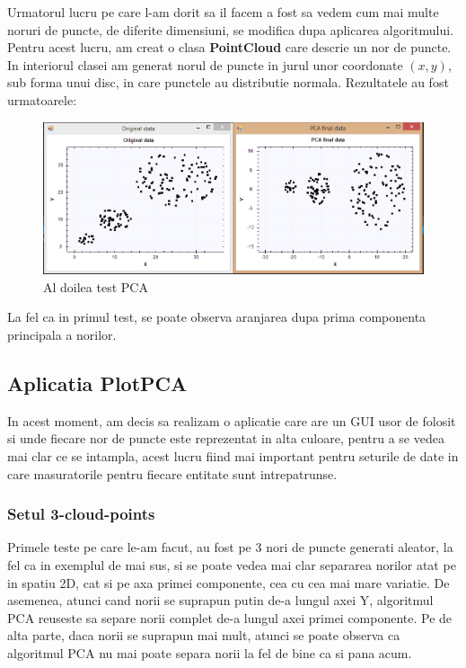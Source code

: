 \documentclass[12pt]{article}
\begin{document}
Urmatorul lucru pe care l-am dorit sa il facem a fost sa vedem cum mai multe noruri de puncte, de diferite dimensiuni, se modifica dupa aplicarea algoritmului. Pentru acest lucru, am creat o clasa \textbf{PointCloud} care descrie un nor de puncte. In interiorul clasei am generat norul de puncte in jurul unor coordonate $\left(x,y\right)$, sub forma unui disc, in care punctele au distributie normala. Rezultatele au fost urmatoarele:

\begin{figure}[H]
\centering
\caption{Al doilea test PCA}
\includegraphics[width=\linewidth]{Test2}
\end{figure}

La fel ca in primul test, se poate observa aranjarea dupa prima componenta principala a norilor.


\subsection{Aplicatia PlotPCA}
In acest moment, am decis sa realizam o aplicatie care are un GUI usor de folosit si unde fiecare nor de puncte este reprezentat in alta culoare, pentru a se vedea mai clar ce se intampla, acest lucru fiind mai important pentru seturile de date in care masuratorile pentru fiecare entitate sunt intrepatrunse.

\subsubsection{Setul 3-cloud-points}
Primele teste pe care le-am facut, au fost pe 3 nori de puncte generati aleator, la fel ca in exemplul de mai sus, si se poate vedea mai clar separarea norilor atat pe in spatiu 2D, cat si pe axa primei componente, cea cu cea mai mare variatie. De asemenea, atunci cand norii se suprapun putin de-a lungul axei Y, algoritmul PCA reuseste sa separe norii complet de-a lungul axei primei componente. Pe de alta parte, daca norii se suprapun mai mult, atunci se poate observa ca algoritmul PCA nu mai poate separa norii la fel de bine ca si pana acum.
\end{document}
